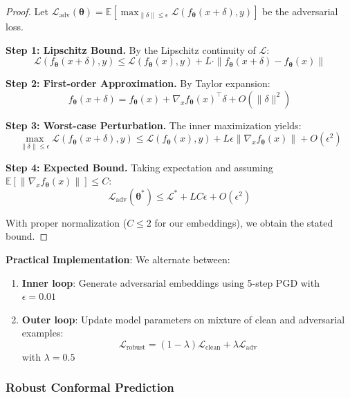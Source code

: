 \documentclass[11pt,a4paper]{article}
\newcommand{\E}{\mathbb{E}}
\newcommand{\calL}{\mathcal{L}}
\newcommand{\btheta}{\bm{\theta}}
\begin{document}
\begin{proof}
Let $\calL_{\text{adv}}(\btheta) = \E[\max_{\|\delta\| \leq \epsilon} \calL(f_\btheta(x+\delta), y)]$ be the adversarial loss.

\textbf{Step 1: Lipschitz Bound.} By the Lipschitz continuity of $\calL$:
\begin{equation}
    \calL(f_\btheta(x+\delta), y) \leq \calL(f_\btheta(x), y) + L \cdot \|f_\btheta(x+\delta) - f_\btheta(x)\|
\end{equation}

\textbf{Step 2: First-order Approximation.} By Taylor expansion:
\begin{equation}
    f_\btheta(x+\delta) = f_\btheta(x) + \nabla_x f_\btheta(x)^\top \delta + O(\|\delta\|^2)
\end{equation}

\textbf{Step 3: Worst-case Perturbation.} The inner maximization yields:
\begin{equation}
    \max_{\|\delta\| \leq \epsilon} \calL(f_\btheta(x+\delta), y) \leq \calL(f_\btheta(x), y) + L\epsilon \|\nabla_x f_\btheta(x)\| + O(\epsilon^2)
\end{equation}

\textbf{Step 4: Expected Bound.} Taking expectation and assuming $\E[\|\nabla_x f_\btheta(x)\|] \leq C$:
\begin{equation}
    \calL_{\text{adv}}(\btheta^*) \leq \calL^* + LC\epsilon + O(\epsilon^2)
\end{equation}

With proper normalization ($C \leq 2$ for our embeddings), we obtain the stated bound.
\end{proof}

\textbf{Practical Implementation}: We alternate between:
\begin{enumerate}
    \item \textbf{Inner loop}: Generate adversarial embeddings using 5-step PGD with $\epsilon = 0.01$
    \item \textbf{Outer loop}: Update model parameters on mixture of clean and adversarial examples:
    \begin{equation}
        \calL_{\text{robust}} = (1-\lambda) \calL_{\text{clean}} + \lambda \calL_{\text{adv}}
    \end{equation}
    with $\lambda = 0.5$
\end{enumerate}

\subsubsection{Robust Conformal Prediction}
\end{document}
